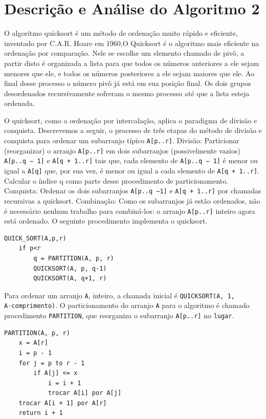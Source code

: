 \documentclass{article}
\begin{document}
\section{Descrição e Análise do Algoritmo 2}

O algoritmo quicksort é um método de ordenação muito rápido e eficiente, inventado por C.A.R. Hoare em 1960,O Quicksort é o algoritmo mais eficiente na ordenação por comparação. Nele se escolhe um elemento chamado de pivô, a partir disto é organizada a lista para que todos os números anteriores a ele sejam menores que ele, e todos os números posteriores a ele sejam maiores que ele. Ao final desse processo o número pivô já está em sua posição final. Os dois grupos desordenados recursivamente sofreram o mesmo processo até que a lista esteja ordenada.

O quicksort, como a ordenação por intercalação, aplica o paradigma de divisão e conquista. Descrevemos a seguir, o processo de três etapas do método de divisão e conquista para ordenar um subarranjo típico \texttt{A[p..r]}. Divisão: Particionar (reorganizar) o arranjo \texttt{A[p..r]} em dois subarranjos (possivelmente vazios) \texttt{A[p..q − 1]} e \texttt{A[q + 1..r]} tais que, cada elemento de \texttt{A[p..q − 1]} é menor ou igual a \texttt{A[q]} que, por sua vez, é menor ou igual a cada elemento de \texttt{A[q + 1..r]}. Calcular o índice q como parte desse procedimento de particionamento. Conquista: Ordenar os dois subarranjos \texttt{A[p..q −1]} e \texttt{A[q + 1..r]} por chamadas recursivas a quicksort. Combinação: Como os subarranjos já estão ordenados, não é necessário nenhum trabalho para combiná-los: o arranjo \texttt{A[p..r]} inteiro agora está ordenado. O seguinte procedimento implementa o quicksort.

\begin{verbatim}
QUICK_SORT(A,p,r)
    if p<r
        q = PARTITION(A, p, r)
        QUICKSORT(A, p, q-1)
        QUICKSORT(A, q+1, r)
\end{verbatim}

Para ordenar um arranjo \texttt{A}, inteiro, a chamada inicial é \texttt{QUICKSORT(A, 1, A⋅comprimento)}.
O particionamento do arranjo \texttt{A} para o algoritmo é chamado procedimento \texttt{PARTITION}, que reorganiza o subarranjo \texttt{A[p..r]} no \texttt{lugar}.

\begin{verbatim}
PARTITION(A, p, r)
    x = A[r]
    i = p - 1
    for j = p to r - 1
        if A[j] <= x
            i = i + 1
            trocar A[i] por A[j]
    trocar A[i + 1] por A[r]
    return i + 1
\end{verbatim}
\end{document}
